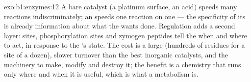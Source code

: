 \begin{solution}{exo:b1:enzymes:12}
A bare catalyst (a platinum surface, an acid) speeds many reactions
indiscriminately; an  speeds one reaction on one  ---
the specificity of its  is already information about what
the  wants done. Regulation adds a second layer:  sites,
phosphorylation sites and zymogen peptides tell the  when and
where to act, in response to the 's state. The cost is a large
 (hundreds of residues for a site of a dozen), slower turnover
than the best inorganic catalysts, and the machinery to make, modify
and destroy it; the benefit is a chemistry that runs only where and
when it is useful, which is what a metabolism is.
\end{solution}

